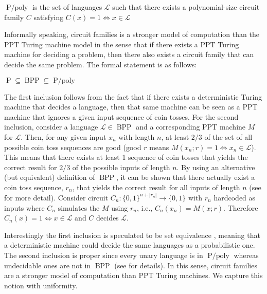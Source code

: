 \begin{definition}
$\operatorname{P/poly}$ is the set of languages $\mathscr{L}$ such that there exists a polynomial-size circuit family $C$ satisfying $C(x) = 1 \iff x \in \mathscr{L}$ 
\end{definition}

Informally speaking, circuit families is a stronger model of computation than the PPT Turing machine model in the sense that if there exists a PPT Turing machine for deciding a problem, then there also exists a circuit family that can decide the same problem. The formal statement is as follows: 

\begin{theorem} \label{theorem: compl-class}
$\operatorname{P} \subseteq \operatorname{BPP} \subsetneq \operatorname{P/poly}$
\end{theorem}

The first inclusion follows from the fact that if there exists a deterministic Turing machine that decides a language, then that same machine can be seen as a PPT machine that ignores a given input sequence of coin tosses. For the second inclusion, consider a language $\mathscr{L} \in \operatorname{BPP}$ and a corresponding PPT machine $M$ for $\mathscr{L}$. Then, for any given input $x_n$ with length $n$, at least $2/3$ of the set of all possible coin toss sequences are good (good $r$ means $M(x_n;r) = 1 \iff x_n \in \mathscr{L}$). This means that there exists at least 1 sequence of coin tosses that yields the correct result for $2/3$ of the possible inputs of length $n$. By using an alternative (but equivalent) definition of $\operatorname{BPP}$, it can be shown that there actually exist a coin toss sequence, $r_n$, that yields the correct result for all inputs of length $n$ (see \cite{Adleman1978TwoTO,Gol01} for more detail). Consider circuit $C_n \colon \{0,1\}^{n+|r_n|} \to \{0,1\}$ with $r_n$ hardcoded as inputs where $C_n$ simulates the $M$ using $r_n$, i.e., $C_n(x_n) = M(x;r)$. Therefore $C_n(x) = 1 \iff x \in \mathscr{L}$ and $C$ decides $\mathscr{L}$.

Interestingly the first inclusion is speculated to be set equivalence \cite[pp. 126]{Arora}, meaning that a deterministic machine could decide the same languages as a probabilistic one. The second inclusion is proper since every unary language is in $\operatorname{P/poly}$ whereas undecidable ones are not in $\operatorname{BPP}$ (see \cite[pp. 110]{Arora} for details). In this sense, circuit families are a stronger model of computation than PPT Turing machines. We capture this notion with uniformity. 

